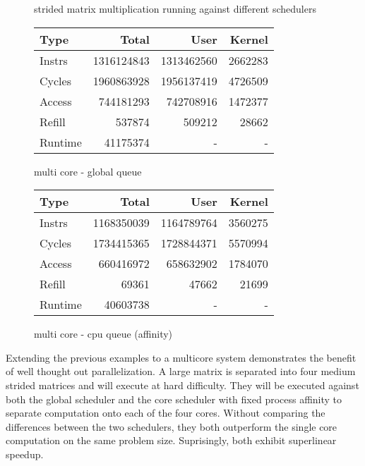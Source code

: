 \documentclass[11pt]{article}
\begin{document}
\begin{figure*}[!h]
	\caption{strided matrix multiplication running against different schedulers}		
	\centering
	\begin{subtable}{.48\linewidth}
		\centering
		\begin{tabular}{ l|rrr }
			Type    & Total     & User      & Kernel  \\
			\hline
            Instrs & 1316124843 & 1313462560 & 2662283 \\
            Cycles & 1960863928 & 1956137419 & 4726509 \\
            Access & 744181293 & 742708916 & 1472377 \\
            Refill & 537874 & 509212 & 28662 \\
            Runtime & 41175374 & - & - \\
			\hline
		\end{tabular}
		\caption{multi core - global queue}
	\end{subtable}
	\begin{subtable}{.48\linewidth} 
		\centering        
		\begin{tabular}{ l|rrr }
			Type    & Total     & User      & Kernel \\
			\hline
            Instrs & 1168350039 & 1164789764 & 3560275 \\
            Cycles & 1734415365 & 1728844371 & 5570994 \\
            Access & 660416972 & 658632902 & 1784070 \\
            Refill & 69361 & 47662 & 21699 \\
            Runtime & 40603738 & - & - \\
			\hline
		\end{tabular}
		\caption{multi core - cpu queue (affinity)}    
	\end{subtable}
\end{figure*}

Extending the previous examples to a multicore system demonstrates the benefit of well thought out parallelization.  A large matrix is separated into four medium strided matrices and will execute at hard difficulty.  They will be executed against both the global scheduler and the core scheduler with fixed process affinity to separate computation onto each of the four cores.  Without comparing the differences between the two schedulers, they both outperform the single core computation on the same problem size.  Suprisingly, both exhibit superlinear speedup.
\end{document}
